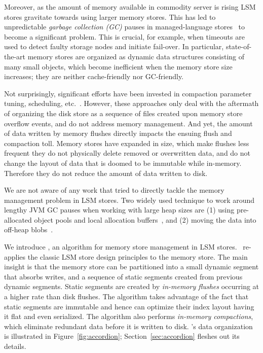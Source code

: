 Moreover, as the amount of memory available in commodity server is rising LSM stores gravitate towards using larger memory stores.
This has led to unpredictable \emph{garbage collection (GC)} pauses in managed-language stores~\cite{cassandra, hbase} to become a significant problem.
This is crucial, for example, when timeouts are used to detect faulty storage nodes and initiate fail-over.
In particular, state-of-the-art memory stores are organized as dynamic data structures consisting of many small objects,
which become inefficient when the memory store size increases; they are neither cache-friendly nor GC-friendly.

Not surprisingly, significant efforts have been invested in compaction parameter tuning, scheduling, etc.~\cite{hbasetuning,
universalcompaction,scylladbcompaction,Sears:2012}. However, these approaches only deal with the aftermath
of organizing the disk store as a sequence of files created upon memory store overflow events, and do not 
address memory management. 
And yet, the amount of data written by memory flushes  
directly impacts the ensuing flush and compaction toll. 
Memory stores have expanded in size, which make flushes less frequent 
they do not physically delete removed or overwritten data, and do not change the layout of data that is doomed to be immutable while in-memory.
Therefore they do not reduce the amount of data written to disk.

We are not aware of any work that tried to directly tackle the memory management problem in LSM stores. 
Two widely used technique to work around lengthy JVM GC pauses when working with large heap sizes are 
(1) using pre-allocated object pools and local allocation buffers~\cite{hbasemslab}, and 
(2) moving the data into off-heap blobs~\cite{cassandraoffheap}. 

We introduce \sys, an algorithm for memory store management in LSM stores. 
\sys\ re-applies the classic LSM store design principles to the memory store. The main insight is that the memory store can be partitioned
 into a small dynamic segment that absorbs writes, and a sequence of static segments created 
 from previous dynamic segments. Static segments are created by \emph{in-memory flushes} occurring at a higher rate
 than disk flushes.  The algorithm takes advantage of the fact that static segments are immutable and hence can optimize their index layout having it flat and even serialized.
 The algorithm also performs \emph{in-memory compactions}, which eliminate redundant %
 data before it is written to disk.
\sys's data organization is illustrated in Figure~\ref{fig:accordion};
 Section~\ref{sec:accordion} fleshes out its details.

